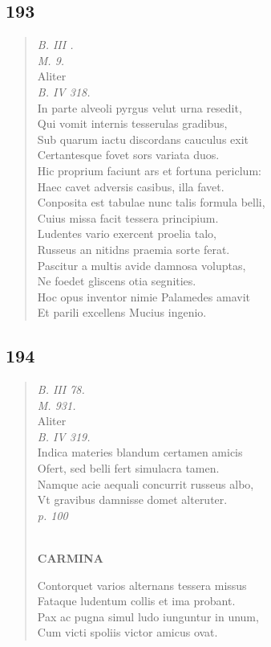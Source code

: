 \documentclass[11pt, a4paper]{report}
\begin{document}
            \subsection*{193}
      \begin{verse}
      \textit{B. III .} \\ \textit{M. 9.} \\ Aliter \\ \textit{B. IV 318.} \\ In parte alveoli pyrgus velut urna resedit, \\ Qui vomit internis tesserulas gradibus, \\ Sub quarum iactu discordans cauculus exit \\ Certantesque fovet sors variata duos. \\ Hic proprium faciunt  \lbrack ars \rbrack  et fortuna periclum: \\ Haec cavet adversis casibus, illa favet. \\ Conposita est tabulae nunc talis formula belli, \\ Cuius missa facit tessera principium. \\ Ludentes vario exercent proelia talo, \\ Russeus an nitidns praemia sorte ferat. \\ Pascitur a multis avide damnosa voluptas, \\ Ne foedet gliscens otia segnities. \\ Hoc opus inventor nimie Palamedes amavit \\ Et parili excellens Mucius ingenio. \\ 
      \end{verse}
  
            \subsection*{194}
      \begin{verse}
      \textit{B. III 78.} \\ \textit{M. 931.} \\ Aliter \\ \textit{B. IV 319.} \\ Indica materies blandum certamen amicis \\ Ofert, sed belli fert simulacra tamen. \\ Namque acie aequali concurrit russeus albo, \\ Vt gravibus damnisse domet alteruter. \\ \textit{p. 100} \\ 
        ﻿\pagebreak 
    \begin{center} \textbf{CARMINA} \end{center} \marginpar{[160]} Contorquet varios alternans tessera missus \\ Fataque ludentum collis et ima probant. \\ Pax ac pugna simul ludo iunguntur in unum, \\ Cum victi spoliis victor amicus ovat. \\ 
      \end{verse}
  
\end{document}
